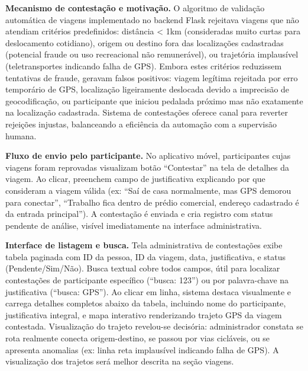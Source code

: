 

\textbf{Mecanismo de contestação e motivação.} O algoritmo de validação automática de viagens implementado no backend Flask rejeitava viagens que não atendiam critérios predefinidos: distância < 1km (consideradas muito curtas para deslocamento cotidiano), origem ou destino fora das localizações cadastradas (potencial fraude ou uso recreacional não remunerável), ou trajetória implausível (teletransportes indicando falha de GPS). Embora estes critérios reduzissem tentativas de fraude, geravam falsos positivos: viagem legítima rejeitada por erro temporário de GPS, localização ligeiramente deslocada devido a imprecisão de geocodificação, ou participante que iniciou pedalada próximo mas não exatamente na localização cadastrada. Sistema de contestações oferece canal para reverter rejeições injustas, balanceando a eficiência da automação com a supervisão humana.

\textbf{Fluxo de envio pelo participante.} No aplicativo móvel, participantes cujas viagens foram reprovadas visualizam botão ``Contestar'' na tela de detalhes da viagem. Ao clicar, preenchem campo de justificativa explicando por que consideram a viagem válida (ex: ``Saí de casa normalmente, mas GPS demorou para conectar'', ``Trabalho fica dentro de prédio comercial, endereço cadastrado é da entrada principal''). A contestação é enviada e cria registro com status pendente de análise, visível imediatamente na interface administrativa.

\textbf{Interface de listagem e busca.} Tela administrativa de contestações exibe tabela paginada com ID da pessoa, ID da viagem, data, justificativa, e status (Pendente/Sim/Não). Busca textual cobre todos campos, útil para localizar contestações de participante específico (``busca: 123'') ou por palavra-chave na justificativa (``busca: GPS''). Ao clicar em linha, sistema destaca visualmente e carrega detalhes completos abaixo da tabela, incluindo nome do participante, justificativa integral, e mapa interativo renderizando trajeto GPS da viagem contestada. Visualização do trajeto revelou-se decisória: administrador constata se rota realmente conecta origem-destino, se passou por vias cicláveis, ou se apresenta anomalias (ex: linha reta implausível indicando falha de GPS). A visualização dos trajetos será melhor descrita na seção viagens.

